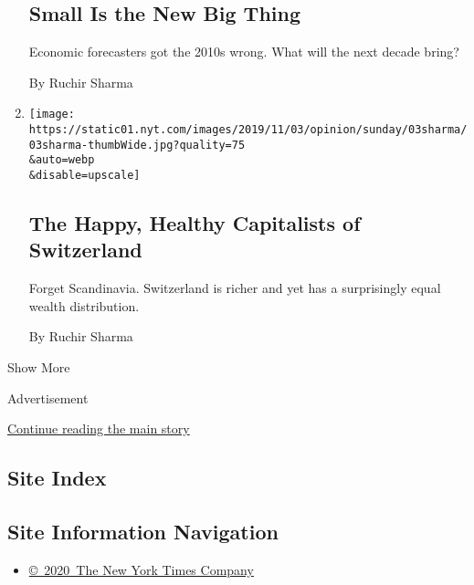 \begin{enumerate}
  \hypertarget{small-is-the-new-big-thing}{%
  \subsection{Small Is the New Big
  Thing}\label{small-is-the-new-big-thing}}

  Economic forecasters got the 2010s wrong. What will the next decade
  bring?

  By Ruchir Sharma
\item
  \href{/2019/11/02/opinion/sunday/switzerland-capitalism-wealth.html}{}

  \texttt{[image: https://static01.nyt.com/images/2019/11/03/opinion/sunday/03sharma/03sharma-thumbWide.jpg?quality=75\\\&auto=webp\\\&disable=upscale]}

  \hypertarget{the-happy-healthy-capitalists-of-switzerland}{%
  \subsection{The Happy, Healthy Capitalists of
  Switzerland}\label{the-happy-healthy-capitalists-of-switzerland}}

  Forget Scandinavia. Switzerland is richer and yet has a surprisingly
  equal wealth distribution.

  By Ruchir Sharma
\end{enumerate}

Show More

Advertisement

\protect\hyperlink{after-mid2}{Continue reading the main story}

\hypertarget{site-index}{%
\subsection{Site Index}\label{site-index}}

\hypertarget{site-information-navigation}{%
\subsection{Site Information
Navigation}\label{site-information-navigation}}

\begin{itemize}
\tightlist
\item
  \href{https://help.nytimes.com/hc/en-us/articles/115014792127-Copyright-notice}{©~2020~The
  New York Times Company}
\end{itemize}

